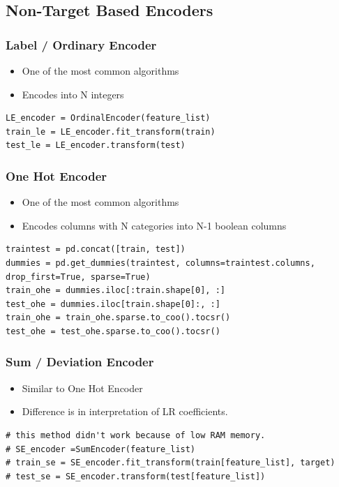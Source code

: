\documentclass{beamer}
\begin{document}
    \subsection{Non-Target Based Encoders}
    \begin{frame}[fragile]
        \frametitle{Label / Ordinary Encoder}
        \begin{itemize}
            \item One of the most common algorithms
            \item Encodes into N integers
            \pause
        \end{itemize}

        \begin{lstlisting}
LE_encoder = OrdinalEncoder(feature_list)
train_le = LE_encoder.fit_transform(train)
test_le = LE_encoder.transform(test)
        \end{lstlisting}
    \end{frame}

    \begin{frame}[fragile]
        \frametitle{One Hot Encoder}
        \begin{itemize}
            \item One of the most common algorithms
            \item Encodes columns with N categories into N-1 boolean columns
            \pause
        \end{itemize}

        \begin{lstlisting}
traintest = pd.concat([train, test])
dummies = pd.get_dummies(traintest, columns=traintest.columns, drop_first=True, sparse=True)
train_ohe = dummies.iloc[:train.shape[0], :]
test_ohe = dummies.iloc[train.shape[0]:, :]
train_ohe = train_ohe.sparse.to_coo().tocsr()
test_ohe = test_ohe.sparse.to_coo().tocsr()
        \end{lstlisting}
    \end{frame}

    \begin{frame}[fragile]
        \frametitle{Sum / Deviation Encoder}
        \begin{itemize}
            \item Similar to One Hot Encoder
            \item Difference is in interpretation of LR coefficients.
            \pause
        \end{itemize}

        \begin{lstlisting}
# this method didn't work because of low RAM memory.
# SE_encoder =SumEncoder(feature_list)
# train_se = SE_encoder.fit_transform(train[feature_list], target)
# test_se = SE_encoder.transform(test[feature_list])
        \end{lstlisting}
    \end{frame}
\end{document}
